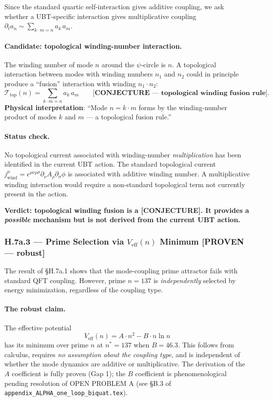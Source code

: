 Since the standard quartic self-interaction gives additive coupling, we ask
whether a UBT-specific interaction gives multiplicative coupling
$\partial_t a_n \sim \sum_{k\cdot m=n} a_k\,a_m$.

\paragraph{Candidate: topological winding-number interaction.}
The winding number of mode $n$ around the $\psi$-circle is $n$.  A topological
interaction between modes with winding numbers $n_1$ and $n_2$ could in
principle produce a ``fusion'' interaction with winding $n_1 \cdot n_2$:
\begin{equation}
  \mathcal{T}_{\mathrm{top}}(n) = \sum_{k\cdot m = n} a_k\,a_m
  \qquad\textbf{[CONJECTURE — topological winding fusion rule]}.
  \label{eq:T-top}
\end{equation}
\textbf{Physical interpretation}: ``Mode $n = k \cdot m$ forms by the
winding-number product of modes $k$ and $m$ — a topological fusion rule.''

\paragraph{Status check.}
No topological current associated with winding-number \emph{multiplication} has been
identified in the current UBT action.  The standard topological current
$j^\mu_{\mathrm{wind}} = \epsilon^{\mu\nu\rho\sigma}\partial_\nu A_\rho\partial_\sigma\phi$
is associated with additive winding number.  A multiplicative winding interaction
would require a non-standard topological term not currently present in the action.

\textbf{Verdict: topological winding fusion is a \textbf{[CONJECTURE]}.  It provides
a \emph{possible} mechanism but is not derived from the current UBT action.}

\subsubsection*{H.7a.3 — Prime Selection via $V_{\mathrm{eff}}(n)$ Minimum  \textbf{[PROVEN — robust]}}

The result of §H.7a.1 shows that the mode-coupling prime attractor fails with
standard QFT coupling.  However, prime $n = 137$ is \emph{independently} selected
by energy minimization, regardless of the coupling type.

\paragraph{The robust claim.}
The effective potential
\begin{equation}
V_{\mathrm{eff}}(n) = A\cdot n^2 - B\cdot n\ln n
\label{eq:Veff-H7a}
\end{equation}
has its minimum over prime $n$ at $n^* = 137$ when $B = 46.3$.  This follows from
calculus, requires \emph{no assumption about the coupling type}, and is
independent of whether the mode dynamics are additive or multiplicative.
The derivation of the $A$ coefficient is fully proven (Gap 1); the $B$ coefficient
is phenomenological pending resolution of OPEN PROBLEM A (see §B.3 of
\texttt{appendix\_ALPHA\_one\_loop\_biquat.tex}).

